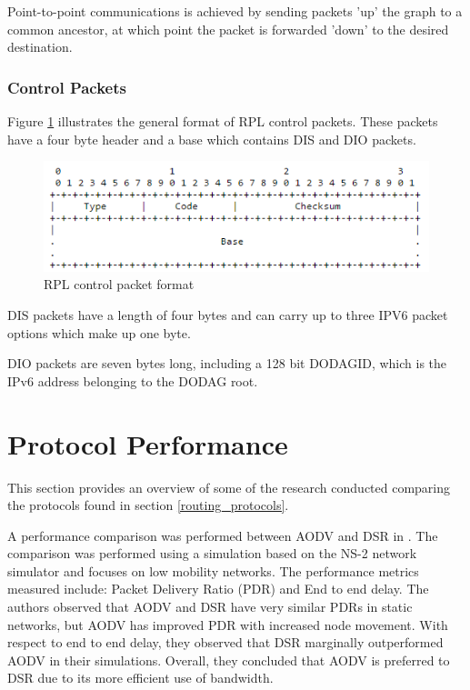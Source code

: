     Point-to-point communications is achieved by sending packets 'up' the graph
    to a common ancestor, at which point the packet is forwarded 'down' to the
    desired destination.

        \subsubsection{Control Packets}
    Figure \ref{fig:rpl_pkt} illustrates the general format of RPL control packets.
    These packets have a four byte header and a base which contains DIS and DIO
    packets.

    \FloatBarrier
    \begin{figure}[ht]
      \includegraphics[scale=0.75]{Images/chapter2/rpl_pkt.png}
      \caption{RPL control packet format}
      \label{fig:rpl_pkt}
    \end{figure}
    \FloatBarrier

    DIS packets have a length of four bytes and can carry up to three
    IPV6 packet options which make up one byte.

    DIO packets are seven bytes long, including a 128 bit DODAGID, which is the
    IPv6 address belonging to the DODAG root.

    \section{Protocol Performance} \label{performance}
    This section provides an overview of some of the research conducted comparing
    the protocols found in section \ref{routing_protocols}.

    A performance comparison was performed between AODV and DSR in \cite{AODV_vs_DSR}.
    The comparison was performed using a simulation based on the NS-2 network simulator
    and focuses on low mobility networks. The performance metrics measured include:
    Packet Delivery Ratio (PDR) and End to end delay. The authors observed that
    AODV and DSR have very similar PDRs in static networks, but AODV has improved
    PDR with increased node movement. With respect to end to end delay, they observed
    that DSR marginally outperformed AODV in their simulations. Overall, they concluded
    that AODV is preferred to DSR due to its more efficient use of bandwidth.

